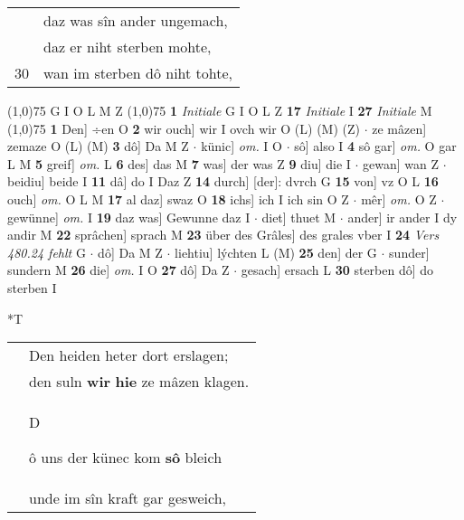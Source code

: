 \documentclass[8pt,a4paper,notitlepage]{article}
\begin{document}
\begin{table}[ht]
\begin{minipage}[t]{0.5\linewidth}
\begin{tabular}{rl}
 & daz was sîn ander ungemach,\\ 
 & daz er niht sterben mohte,\\ 
30 & wan im sterben dô niht tohte,\\ 
\end{tabular}
\scriptsize
\line(1,0){75} \newline
G I O L M Z \newline
\line(1,0){75} \newline
\textbf{1} \textit{Initiale} G I O L Z  \textbf{17} \textit{Initiale} I  \textbf{27} \textit{Initiale} M  \newline
\line(1,0){75} \newline
\textbf{1} Den] ÷en O \textbf{2} wir ouch] wir I ovch wir O (L) (M) (Z)  $\cdot$ ze mâzen] zemaze O (L) (M) \textbf{3} dô] Da M Z  $\cdot$ künic] \textit{om.} I O  $\cdot$ sô] also I \textbf{4} sô gar] \textit{om.} O gar L M \textbf{5} greif] \textit{om.} L \textbf{6} des] das M \textbf{7} was] der was Z \textbf{9} diu] die I  $\cdot$ gewan] wan Z  $\cdot$ beidiu] beide I \textbf{11} dâ] do I Daz Z \textbf{14} durch] [der]: dvrch G \textbf{15} von] vz O L \textbf{16} ouch] \textit{om.} O L M \textbf{17} al daz] swaz O \textbf{18} ichs] ich I ich sin O Z  $\cdot$ mêr] \textit{om.} O Z  $\cdot$ gewünne] \textit{om.} I \textbf{19} daz was] Gewunne daz I  $\cdot$ diet] thuet M  $\cdot$ ander] ir ander I dy andir M \textbf{22} sprâchen] sprach M \textbf{23} über des Grâles] des grales vber I \textbf{24} \textit{Vers 480.24 fehlt} G   $\cdot$ dô] Da M Z  $\cdot$ liehtiu] lýchten L (M) \textbf{25} den] der G  $\cdot$ sunder] sundern M \textbf{26} die] \textit{om.} I O \textbf{27} dô] Da Z  $\cdot$ gesach] ersach L \textbf{30} sterben dô] do sterben I \newline
\end{minipage}
\hspace{0.5cm}
\begin{minipage}[t]{0.5\linewidth}
\small
\begin{center}*T
\end{center}
\begin{tabular}{rl}
 & Den heiden heter dort erslagen;\\ 
 & den suln \textbf{wir} \textbf{hie} ze mâzen klagen.\\ 
 & \begin{large}D\end{large}ô uns der künec kom \textbf{sô} bleich\\ 
 & unde im sîn kraft gar gesweich,\\ 

\end{tabular}
\end{minipage}
\end{table}
\end{document}
